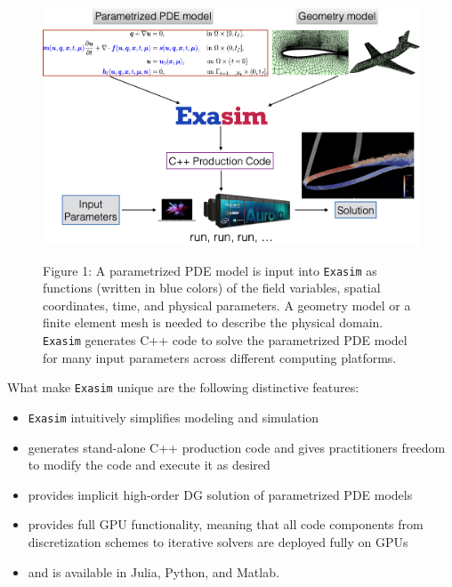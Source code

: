 \documentclass[11pt]{article}
\begin{document}
\begin{figure}[th]
\begin{center}
\includegraphics[scale=1.1]{exasim3.png} \\
\label{fig1}
\end{center}
Figure 1:   A parametrized PDE model is input into  \texttt{Exasim} as functions (written in blue colors) of the field variables, spatial coordinates, time, and physical parameters.  A geometry model or a finite element mesh is needed to describe the physical domain.  \texttt{Exasim} generates C++ code to solve the parametrized PDE model for many input parameters across different computing platforms. 
\end{figure}


What make \texttt{Exasim} unique are the following distinctive features: 

\begin{itemize}
\item \texttt{Exasim} intuitively simplifies  modeling and simulation %
\item  generates stand-alone C++ production code and gives practitioners  freedom to modify the code and execute it as desired
\item provides implicit high-order DG solution of parametrized PDE models
\item provides full GPU functionality, meaning that all code components from discretization schemes to iterative solvers are deployed fully on GPUs
\item and is available in Julia, Python, and Matlab. 
\end{itemize}
\end{document}
